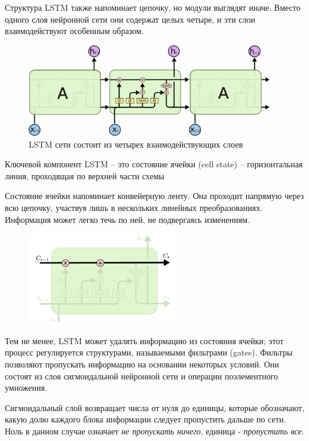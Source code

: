 	Структура LSTM также напоминает цепочку, но модули выглядят иначе. Вместо одного слоя нейронной сети они содержат целых четыре, и эти слои взаимодействуют особенным образом. 
	
	\begin{figure}[ht!]
		\centering
		\captionsetup{justification=centering}
		\includegraphics[height=40mm]{img/LSTM Chain.png}
		\caption{LSTM сети состоит из четырех взаимодействующих слоев}
	\end{figure}
	
	Ключевой компонент LSTM – это состояние ячейки (cell state) – горизонтальная линия, проходящая по верхней части схемы
	
	Состояние ячейки напоминает конвейерную ленту. Она проходит напрямую через всю цепочку, участвуя лишь в нескольких линейных преобразованиях. Информация может легко течь по ней, не подвергаясь изменениям.
	
	\begin{figure}[ht!]
		\centering
		\captionsetup{justification=centering}
		\includegraphics[height=40mm]{img/LSTM 1.png}
	\end{figure}
	
	Тем не менее, LSTM может удалять информацию из состояния ячейки; этот процесс регулируется структурами, называемыми фильтрами (gates). Фильтры позволяют пропускать информацию на основании некоторых условий. Они состоят из слоя сигмоидальной нейронной сети и операции поэлементного умножения.
	
	Сигмоидальный слой возвращает числа от нуля до единицы, которые обозначают, какую долю каждого блока информации следует пропустить дальше по сети. Ноль в данном случае означает \textit{не пропускать ничего}, единица - \textit{пропустить все}.

